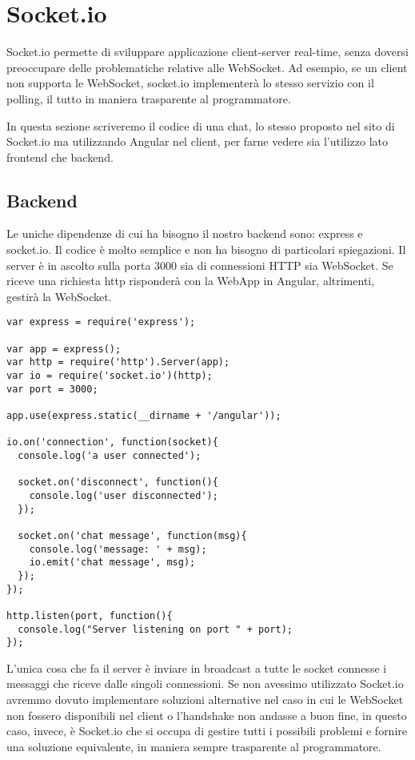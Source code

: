 \section{Socket.io}
\label{sec:socket.io}
Socket.io permette di sviluppare applicazione client-server real-time, 
senza doversi preoccupare delle problematiche relative alle WebSocket.
Ad esempio, se un client non supporta le WebSocket, socket.io implementerà lo stesso servizio con il polling, il tutto in maniera trasparente al programmatore.

In questa sezione scriveremo il codice di una chat, lo stesso proposto nel sito di Socket.io ma utilizzando Angular nel client, 
per farne vedere sia l'utilizzo lato frontend che backend.

\subsection{Backend}
Le uniche dipendenze di cui ha bisogno il nostro backend sono: express e socket.io.
Il codice è molto semplice e non ha bisogno di particolari spiegazioni.
Il server è in ascolto sulla porta 3000 sia di connessioni HTTP sia WebSocket.
Se riceve una richiesta http risponderà con la WebApp in Angular,
altrimenti, gestirà la WebSocket.
\begin{lstlisting}[caption={backend chat socket.io}, style=javaScriptCode]
var express = require('express');

var app = express();
var http = require('http').Server(app);
var io = require('socket.io')(http);
var port = 3000;

app.use(express.static(__dirname + '/angular'));

io.on('connection', function(socket){
  console.log('a user connected');

  socket.on('disconnect', function(){
    console.log('user disconnected');
  });

  socket.on('chat message', function(msg){
    console.log('message: ' + msg);
    io.emit('chat message', msg);
  });
});

http.listen(port, function(){
  console.log("Server listening on port " + port);
});
\end{lstlisting} 
L'unica cosa che fa il server è inviare in broadcast a tutte le socket connesse i messaggi che riceve dalle singoli connessioni.
Se non avessimo utilizzato Socket.io avremmo dovuto implementare soluzioni alternative nel caso in cui le WebSocket non fossero disponibili nel client o 
l'handshake non andasse a buon fine, in questo caso, invece, è Socket.io che si occupa di gestire tutti i possibili problemi e fornire una soluzione equivalente, in maniera sempre trasparente al programmatore.
